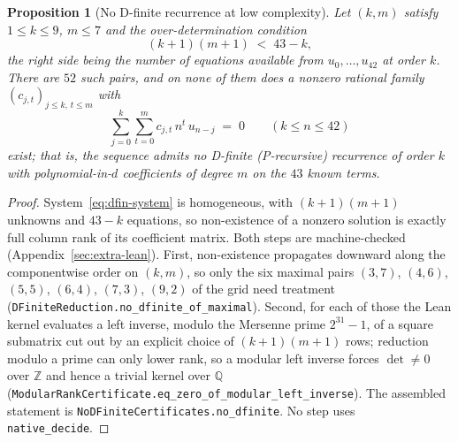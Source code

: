 \documentclass[11pt]{article}
\theoremstyle{plain}
\newtheorem{proposition}[theorem]{Proposition}
\theoremstyle{definition}
\theoremstyle{remark}
\begin{document}
\begin{proposition}[No D-finite recurrence at low complexity]
\label{prop:no-dfinite}
Let $(k,m)$ satisfy $1 \le k \le 9$, $m \le 7$ and the over-determination
condition
\begin{equation}\label{eq:overdet}
   (k+1)(m+1) \;<\; 43 - k ,
\end{equation}
the right side being the number of equations available from
$u_0, \ldots, u_{42}$ at order $k$. There are $52$ such pairs, and on
none of them does a nonzero rational family $(c_{j,t})_{j \le k,\, t \le m}$
with
\begin{equation}\label{eq:dfin-system}
   \sum_{j=0}^{k} \sum_{t=0}^{m} c_{j,t}\, n^{t}\, u_{n-j} \;=\; 0
   \qquad (k \le n \le 42)
\end{equation}
exist; that is, the sequence admits no D-finite (P-recursive) recurrence of
order $k$ with polynomial-in-$d$ coefficients of degree $m$ on the $43$ known
terms.
\end{proposition}

\begin{proof}
System~\eqref{eq:dfin-system} is homogeneous, with $(k+1)(m+1)$ unknowns and
$43-k$ equations, so non-existence of a nonzero solution is exactly full
column rank of its coefficient matrix. Both steps are machine-checked
(Appendix~\ref{sec:extra-lean}). First, non-existence propagates downward
along the componentwise order on $(k,m)$, so only the six maximal pairs
$(3,7)$, $(4,6)$, $(5,5)$, $(6,4)$, $(7,3)$, $(9,2)$ of the grid need
treatment (\texttt{DFiniteReduction.no\_dfinite\_of\_maximal}). Second, for
each of those the Lean kernel evaluates a left inverse, modulo the Mersenne
prime $2^{31}-1$, of a square submatrix cut out by an explicit choice of
$(k+1)(m+1)$ rows; reduction modulo a prime can only lower rank, so a modular
left inverse forces $\det \neq 0$ over $\mathbb{Z}$ and hence a trivial kernel
over $\mathbb{Q}$ (\texttt{ModularRankCertificate.eq\_zero\_of\_modular\_left\_inverse}).
The assembled statement is \texttt{NoDFiniteCertificates.no\_dfinite}. No step
uses \texttt{native\_decide}.
\end{proof}
\end{document}
